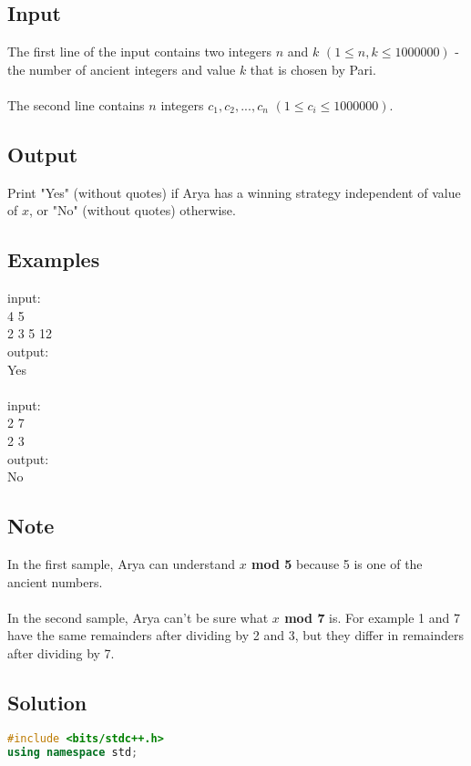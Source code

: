 \documentclass[10pt,a4paper]{article}
\begin{document}
\begin{itemize}
\subsection*{Input}
The first line of the input contains two integers $n$ and $k$ $(1 \leq n, k \leq 1000000)$ - the number of ancient integers and value $k$ that is chosen by Pari.
\\ \\
The second line contains $n$ integers $c_1,c_2,...,c_n$ $(1 \leq c_i \leq 1000000)$.

\subsection*{Output}
Print "Yes" (without quotes) if Arya has a winning strategy independent of value of $x$, or "No" (without quotes) otherwise.

\subsection*{Examples}
input: \\
4 5 \\
2 3 5 12 
\\
output: \\
Yes 
\\ \\
input: \\
2 7 \\
2 3 \\
output: \\
No 

\subsection*{Note}
In the first sample, Arya can understand \textbf{$x$ mod 5} because 5 is one of the ancient numbers.
\\ \\
In the second sample, Arya can't be sure what \textbf{$x$ mod 7} is. For example 1 and 7 have the same remainders after dividing by 2 and 3, but they differ in remainders after dividing by 7.


\subsection*{Solution}
\begin{lstlisting}[language=C++, caption={Remainders Game}, label={1st:code}, mathescape=true, breaklines=true]
#include <bits/stdc++.h>
using namespace std;


\end{lstlisting}
\end{itemize}
\end{document}
